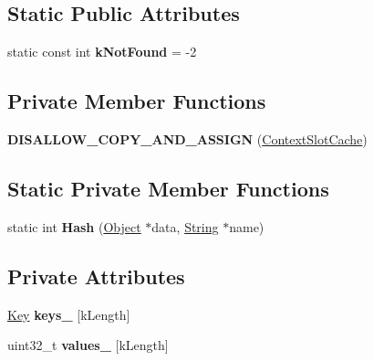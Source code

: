 \subsection*{Static Public Attributes}
\begin{DoxyCompactItemize}
\item 
static const int {\bfseries k\+Not\+Found} = -\/2\hypertarget{classv8_1_1internal_1_1_context_slot_cache_a596b1217f2c589e46a4327d567c336c2}{}\label{classv8_1_1internal_1_1_context_slot_cache_a596b1217f2c589e46a4327d567c336c2}

\end{DoxyCompactItemize}
\subsection*{Private Member Functions}
\begin{DoxyCompactItemize}
\item 
{\bfseries D\+I\+S\+A\+L\+L\+O\+W\+\_\+\+C\+O\+P\+Y\+\_\+\+A\+N\+D\+\_\+\+A\+S\+S\+I\+GN} (\hyperlink{classv8_1_1internal_1_1_context_slot_cache}{Context\+Slot\+Cache})\hypertarget{classv8_1_1internal_1_1_context_slot_cache_abfea02993ce4e93c3db33a32d6df0b42}{}\label{classv8_1_1internal_1_1_context_slot_cache_abfea02993ce4e93c3db33a32d6df0b42}

\end{DoxyCompactItemize}
\subsection*{Static Private Member Functions}
\begin{DoxyCompactItemize}
\item 
static int {\bfseries Hash} (\hyperlink{classv8_1_1internal_1_1_object}{Object} $\ast$data, \hyperlink{classv8_1_1internal_1_1_string}{String} $\ast$name)\hypertarget{classv8_1_1internal_1_1_context_slot_cache_a1d98566c2df1c19c64da57b63c6a1267}{}\label{classv8_1_1internal_1_1_context_slot_cache_a1d98566c2df1c19c64da57b63c6a1267}

\end{DoxyCompactItemize}
\subsection*{Private Attributes}
\begin{DoxyCompactItemize}
\item 
\hyperlink{structv8_1_1internal_1_1_context_slot_cache_1_1_key}{Key} {\bfseries keys\+\_\+} \mbox{[}k\+Length\mbox{]}\hypertarget{classv8_1_1internal_1_1_context_slot_cache_aac784094a9da88bc2d9e6100249e75fc}{}\label{classv8_1_1internal_1_1_context_slot_cache_aac784094a9da88bc2d9e6100249e75fc}

\item 
uint32\+\_\+t {\bfseries values\+\_\+} \mbox{[}k\+Length\mbox{]}\hypertarget{classv8_1_1internal_1_1_context_slot_cache_a8f78ed00a1b03b867173990060e4344f}{}\label{classv8_1_1internal_1_1_context_slot_cache_a8f78ed00a1b03b867173990060e4344f}

\end{DoxyCompactItemize}
